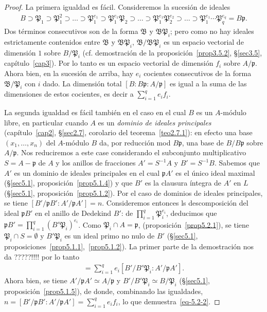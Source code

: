 \documentclass[10pt,oneside,bibtotoc,smallheadings,leqno,a5paper,DIV=12]{scrbook}
\newcommand{\idl}[1]{\mathfrak{#1}}
\numberwithin{equation}{section}
\theoremstyle{defi}
\theoremstyle{enonce}
\theoremstyle{rem}
\numberwithin{theorem}{section}
\numberwithin{proposition}{section}
\numberwithin{definition}{section}
\numberwithin{lemma}{section}
\numberwithin{corollary}{section}
\numberwithin{example}{section}
\numberwithin{footnote}{section}%
\begin{document}
\begin{proof}
La primera igualdad es f\'acil. Consideremos la sucesi\'on de ideales
\begin{gather*}
B\supset\idl{P}_{1}\supset\idl{P}_{1}^{2}\supset\dots\supset\idl{P}_{1}^{e_{1}}\supset\idl{P}_{1}^{e_{1}}\idl{P}_{2}
\supset\dots\supset\idl{P}_{1}^{e_{1}}\idl{P}_{2}^{e_{2}}\supset\dots\supset\idl{P}_{1}^{e_{1}}\cdots\idl{P}_{q}^{e_{q}}
=B\idl{p}.
\end{gather*}
Dos t\'erminos consecutivos son de la forma $\idl{B}$ y $\idl{B}\idl{P}_{i}$; pero como no hay ideales estrictamente
contenidos entre $\idl{B}$ y $\idl{B}\idl{P}_{i}$, $\idl{B}/\idl{B}\idl{P}_{i}$ es un espacio vectorial de dimensi\'on
$1$ sobre $B/\idl{P}_{i}$ (cf. demostraci\'on de la proposici\'on~\ref{prop3.5.2}, \S\ref{sec3.5}, cap\'itulo~\ref{cap3}).
Por lo tanto es un
espacio vectorial de dimensi\'on $f_{i}$ sobre $A/\idl{p}$. Ahora bien, en la sucesi\'on de arriba, hay $e_{i}$
cocientes consecutivos de la forma $\idl{B}/\idl{P}_{i}$ con $i$ dado. La dimensi\'on total $[B:B\idl{p}:A/\idl{p}]$
es igual a la suma de las dimensiones de estos cocientes, es decir a $\sum_{i=1}^{q}e_{i}f_{i}$.

La segunda igualdad es f\'acil tambi\'en en el caso en el cual $B$ es un $A$-m\'odulo libre, en particular cuando
$A$ es un {\em dominio de ideales principales}
(cap\'itulo~\ref{cap2}, \S\ref{sec2.7}, corolario del teorema~\ref{teo2.7.1}): en efecto una
base $(x_{1},\dots,x_{n})$ del $A$-m\'odulo $B$ da, por reducci\'on mod $B\idl{p}$, una base de $B/B\idl{p}$ sobre
$A/\idl{p}$. Nos reduciremos a este case considerando el subconjunto multiplicativo $S = A-\idl{p}$ de $A$ y
los anillos de fracciones $A' = S^{-1}A$ y $B' = S^{-1}B$. Sabemos que $A'$ es un dominio de ideales principales
en el cual $\idl{p}A'$ es el \'unico ideal maximal (\S\ref{sec5.1}, proposici\'on~\ref{prop5.1.4}) y que $B'$ es la clausura \'integra de $A'$ en $L$
(\S\ref{sec5.1}, proposici\'on~\ref{prop5.1.2}). Por el caso de dominios de ideales principales, se tiene $[B'/\idl{p}B':A'/\idl{p}A']=n$.
Consideremos entonces ls descomposici\'on del ideal $\idl{p}B'$ en el anillo de Dedekind $B'$:
de $\prod_{i=1}^{q}\idl{P}_{i}^{e_{i}}$, deducimos que $\idl{p}B' = \prod_{i=1}^{q}(B'\idl{P}_{i})^{e_{i}}$. Como
$\idl{P}_{i}\cap A=\idl{p}$, (proposici\'on~\ref{prop5.2.1}), se tiene $\idl{P}_{i}\cap S = \emptyset$ y $B'\idl{P}_{i}$ es un ideal primo
no nulo de $B'$ (\S\ref{sec5.1}, proposiciones~\ref{prop5.1.1},~\ref{prop5.1.2}). La primer parte de la demostraci\'on nos da ?????!!!! por lo tanto
\begin{gather*}
[B'/\idl{p}B':A'/\idl{p}A']=\sum_{i=1}^{q}e_{i}[B'/B'\idl{P}_{i}:A'/\idl{p}A'].
\end{gather*}
Ahora bien, se tiene $A'/\idl{p}A'\simeq A/\idl{p}$ y $B'/B'\idl{P}_{i}\simeq B/\idl{P}_{i}$ (\S\ref{sec5.1},
proposici\'on~\ref{prop5.1.5}),
de donde, combinando las igualdades, $n=[B'/\idl{p}B':A'/\idl{p}A']=\sum_{i=1}^{q}e_{i}f_{i}$, lo que
demuestra~\eqref{eq-5.2-2}.
\end{proof}
\end{document}
